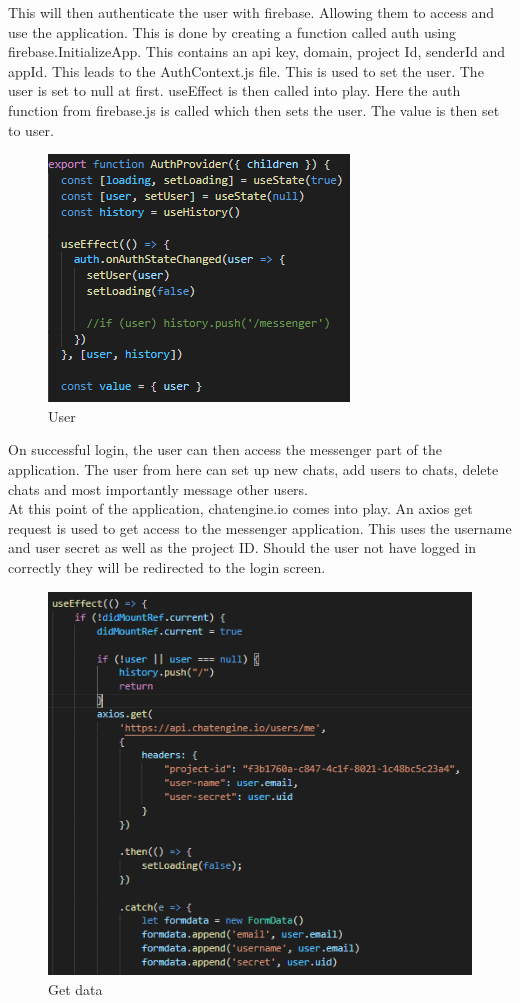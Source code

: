 This will then authenticate the user with firebase. Allowing them to access and use the application. This is done by creating a function called auth using firebase.InitializeApp. This contains an api key, domain, project Id, senderId and appId.  This leads to the AuthContext.js file. This is used to set the user. The user is set to null at first. useEffect is then called into play. Here the auth function from firebase.js is called which then sets the user. The value is then set to user. \\
\begin{figure}[H]
    \centering
    \includegraphics{img/messenger2.png}
    \caption{User} 
    \label{fig:my_label}
\end{figure}

On successful login, the user can then access the messenger part of the application. The user from here can set up new chats, add users to chats, delete chats and most importantly message other users. \\
At this point of the application, chatengine.io comes into play. An axios get request is used to get access to the messenger application. This uses the username and user secret as well as the project ID. Should the user not have logged in correctly they will be redirected to the login screen. \\
\begin{figure}[H]
    \centering
    \includegraphics{img/messenger3.png}
    \caption{Get data} 
    \label{fig:my_label}
\end{figure}

